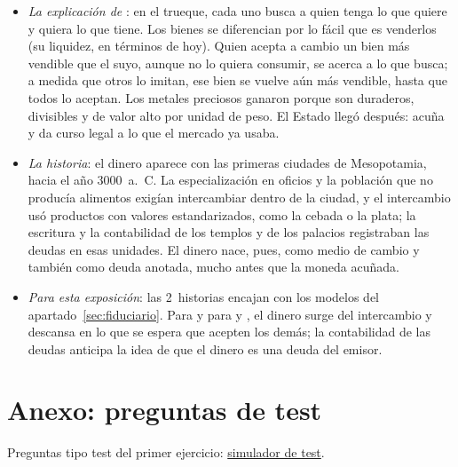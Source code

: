 \documentclass[11pt]{article}
\begin{document}
\begin{itemize}
\item \emph{La explicación de }: en el trueque, cada uno busca a quien tenga lo que quiere y quiera lo que tiene. Los bienes se diferencian por lo fácil que es venderlos (su liquidez, en términos de hoy). Quien acepta a cambio un bien más vendible que el suyo, aunque no lo quiera consumir, se acerca a lo que busca; a medida que otros lo imitan, ese bien se vuelve aún más vendible, hasta que todos lo aceptan. Los metales preciosos ganaron porque son duraderos, divisibles y de valor alto por unidad de peso. El Estado llegó después: acuña y da curso legal a lo que el mercado ya usaba\nocite{Menger1892Origin}.
\item \emph{La historia}: el dinero aparece con las primeras ciudades de Mesopotamia, hacia el año 3000~a.~C. La especialización en oficios y la población que no producía alimentos exigían intercambiar dentro de la ciudad, y el intercambio usó productos con valores estandarizados, como la cebada o la plata; la escritura y la contabilidad de los templos y de los palacios registraban las deudas en esas unidades\nocite{Comin2014Historia}. El dinero nace, pues, como medio de cambio y también como deuda anotada, mucho antes que la moneda acuñada.
\item \emph{Para esta exposición}: las 2~historias encajan con los modelos del apartado~\ref{sec:fiduciario}. Para  y para  y , el dinero surge del intercambio y descansa en lo que se espera que acepten los demás; la contabilidad de las deudas anticipa la idea de que el dinero es una deuda del emisor.
\end{itemize}

\section{Anexo: preguntas de test}\label{anexo:test}

\begin{anotaciones}
Preguntas tipo test del primer ejercicio: \href{https://www.victorgutierrezmarcos.es/oposicion/temario/primer-ejercicio/test/simulador.html?tema=3.A.35}{simulador de test}.
\end{anotaciones}

\bibliografia
\end{document}
